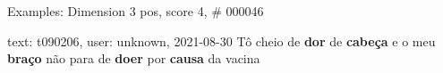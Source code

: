 \begin{frame}{Examples: Dimension 3 pos, score 4, \# 000046}
\footnotesize
\begin{exampleblock}{text: t090206, user: unknown, 2021-08-30}
Tô cheio de \textbf{dor} de \textbf{cabeça} e o meu \textbf{braço} não para de 
\textbf{doer} por \textbf{causa} da vacina 
\end{exampleblock}
\end{frame}

